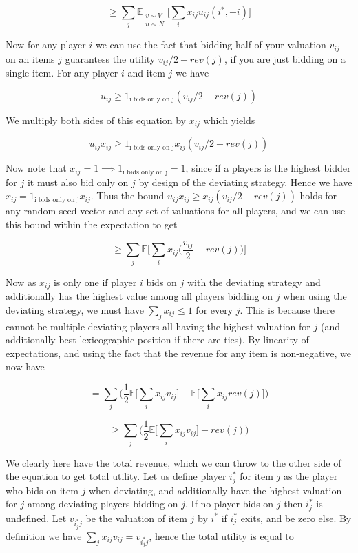 $$
\ge \sum_j  \mathbb{E}_{ \substack{ v \sim V \\ n \sim N }} \bigg[ \sum_i  x_{ij} u_{ij}(i^*, -i)  \bigg]
$$

Now for any player $i$ we can use the fact that bidding half of your valuation $v_{ij}$ on an items $j$ guarantess the utility $v_{ij}/2 - rev(j)$, if you are just bidding on a single item. For any player $i$ and item $j$ we have

$$
u_{ij} \ge 1_{\textrm{i bids only on j}} (v_{ij}/2 - rev(j))
$$

We multiply both sides of this equation by $x_{ij}$ which yields

$$
u_{ij} x_{ij} \ge 1_{\textrm{i bids only on j}} x_{ij} (v_{ij}/2 - rev(j))
$$

Now note that $x_{ij}=1 \implies 1_{\textrm{i bids only on j}} = 1$, since if a players is the highest bidder for $j$ it must also bid only on $j$ by design of the deviating strategy. Hence we have $x_{ij}= 1_{\textrm{i bids only on j}} x_{ij}$. Thus the bound $u_{ij} x_{ij} \ge x_{ij} (v_{ij}/2 - rev(j))$ holds for any random-seed vector and any set of valuations for all players, and we can use this bound within the expectation to get

$$
\ge \sum_j  \mathbb{E} \bigg[ \sum_i  x_{ij} \bigg( \frac{v_{ij}}{2} - rev(j) \bigg) \bigg]
$$

Now as $x_{ij}$ is only one if player $i$ bids on $j$ with the deviating strategy and additionally has the highest value among all players bidding on $j$ when using the deviating strategy, we must have $\sum_{j} x_{ij} \le 1$ for every $j$. This is because there cannot be multiple deviating players all having the highest valuation for $j$ (and additionally best lexicographic position if there are ties). By linearity of expectations, and using the fact that the revenue for any item is non-negative, we now have

$$
=  \sum_j  \bigg( \frac{1}{2} \mathbb{E} \bigg[ \sum_i  x_{ij} v_{ij} \bigg]  - \mathbb{E} \bigg[ \sum_i x_{ij}  rev(j)  \bigg] \bigg)
$$


$$
\ge \sum_j  \bigg(  \frac{1}{2} \mathbb{E} \bigg[ \sum_i  x_{ij} v_{ij} \bigg]  -   rev(j)  \bigg)
$$

We clearly here have the total revenue, which we can throw to the other side of the equation to get total utility. Let us define player $i^*_j$ for item $j$ as the player who bids on item $j$ when deviating, and additionally have the highest valuation for $j$ among deviating players bidding on $j$. If no player bids on $j$ then $i^*_j$ is undefined.  Let $v_{i^*_j j}$ be the valuation of item $j$ by $i^*$ if $i^*_j$ exits, and be zero else. By definition we have $\sum_j x_{ij} v_{ij} = v_{i^*_j j}$, hence the total utility is equal to

